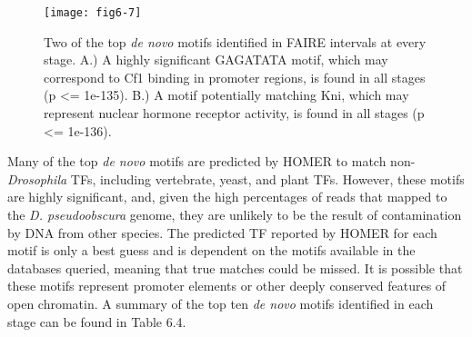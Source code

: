 \begin{figure}
\centering
\texttt{[image: fig6-7]}
\caption[Two of the top \emph{de novo} motifs identified in FAIRE intervals at every stage]{Two of the top \emph{de novo} motifs identified in FAIRE intervals at every stage. A.) A highly significant GAGATATA motif, which may correspond to Cf1 binding in promoter regions, is found in all stages (p \textless= 1e-135). B.) A motif potentially matching Kni, which may represent nuclear hormone receptor activity, is found in all stages (p \textless= 1e-136).}
\label{Figure 6.7}
\end{figure}

Many of the top \emph{de novo} motifs are predicted by HOMER to match non-\emph{Drosophila} TFs, including vertebrate, yeast, and plant TFs. However, these motifs are highly significant, and, given the high percentages of reads that mapped to the \emph{D. pseudoobscura} genome, they are unlikely to be the result of contamination by DNA from other species. The predicted TF reported by HOMER for each motif is only a best guess and is dependent on the motifs available in the databases queried, meaning that true matches could be missed. It is possible that these motifs represent promoter elements or other deeply conserved features of open chromatin. A summary of the top ten \emph{de novo} motifs identified in each stage can be found in Table 6.4.

